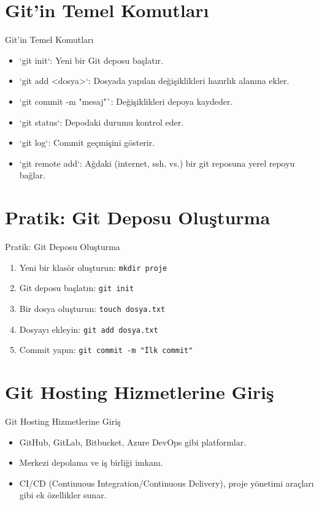 \documentclass{beamer}
\begin{document}
\section{Git'in Temel Komutları}
\begin{frame}{Git'in Temel Komutları}
    \begin{itemize}
        \item `git init`: Yeni bir Git deposu başlatır.
        \item `git add <dosya>`: Dosyada yapılan değişiklikleri hazırlık alanına ekler.
        \item `git commit -m "mesaj"`: Değişiklikleri depoya kaydeder.
        \item `git status`: Depodaki durumu kontrol eder.
        \item `git log`: Commit geçmişini gösterir.
        \item `git remote add`: Ağdaki (internet, ssh, vs.) bir git reposuna yerel repoyu bağlar.
    \end{itemize}
\end{frame}

\section{Pratik: Git Deposu Oluşturma}
\begin{frame}{Pratik: Git Deposu Oluşturma}
    \begin{enumerate}
        \item Yeni bir klasör oluşturun: \texttt{mkdir proje}
        \item Git deposu başlatın: \texttt{git init}
        \item Bir dosya oluşturun: \texttt{touch dosya.txt}
        \item Dosyayı ekleyin: \texttt{git add dosya.txt}
        \item Commit yapın: \texttt{git commit -m "İlk commit"}
    \end{enumerate}
\end{frame}

\section{Git Hosting Hizmetlerine Giriş}
\begin{frame}{Git Hosting Hizmetlerine Giriş}
    \begin{itemize}
        \item GitHub, GitLab, Bitbucket, Azure DevOps gibi platformlar.
        \item Merkezi depolama ve iş birliği imkanı.
        \item CI/CD (Continuous Integration/Continuous Delivery), proje yönetimi araçları gibi ek özellikler sunar.
    \end{itemize}

\end{frame}
\end{document}
